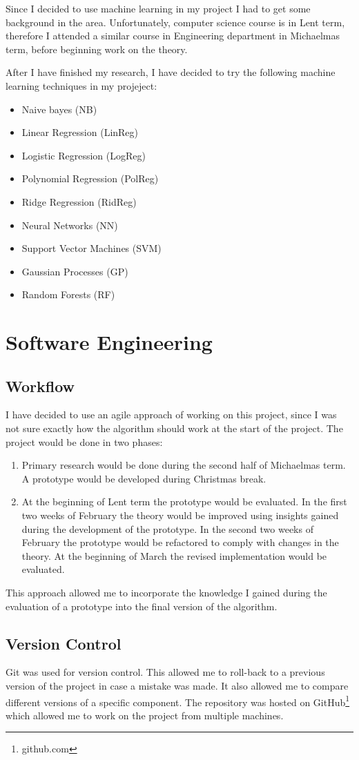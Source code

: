 \documentclass[12pt,a4paper]{book}
\begin{document}
Since I decided to use machine learning in my project I had to get some background in the area.
Unfortunately, computer science course is in Lent term, therefore I attended a similar course in Engineering department in Michaelmas term, before beginning work on the theory.

After I have finished my research, I have decided to try the following machine learning techniques in my projeject:
\begin{itemize}
\item Naive bayes (NB)
\item Linear Regression (LinReg)
\item Logistic Regression (LogReg)
\item Polynomial Regression (PolReg)
\item Ridge Regression (RidReg)
\item Neural Networks (NN)
\item Support Vector Machines (SVM)
\item Gaussian Processes (GP)
\item Random Forests (RF)
\end{itemize}
\section{Software Engineering}
\subsection{Workflow}
I have decided to use an agile approach of working on this project, since I was not sure exactly how the algorithm should work at the start of the project.
The project would be done in two phases:
\begin{enumerate}
\item Primary research would be done during the second half of Michaelmas term.
A prototype would be developed during Christmas break.
\item At the beginning of Lent term the prototype would be evaluated.
In the first two weeks of February the theory would be improved using insights gained during the development of the prototype.
In the second two weeks of February the prototype would be refactored to comply with changes in the theory.
At the beginning of March the revised implementation would be evaluated.
\end{enumerate}
This approach allowed me to incorporate the knowledge I gained during the evaluation of a prototype into the final version of the algorithm.
\subsection{Version Control}
Git was used for version control.
This allowed me to roll-back to a previous version of the project in case a mistake was made.
It also allowed me to compare different versions of a specific component.
The repository was hosted on GitHub\footnote{github.com} which allowed me to work on the project from multiple machines.
\end{document}
